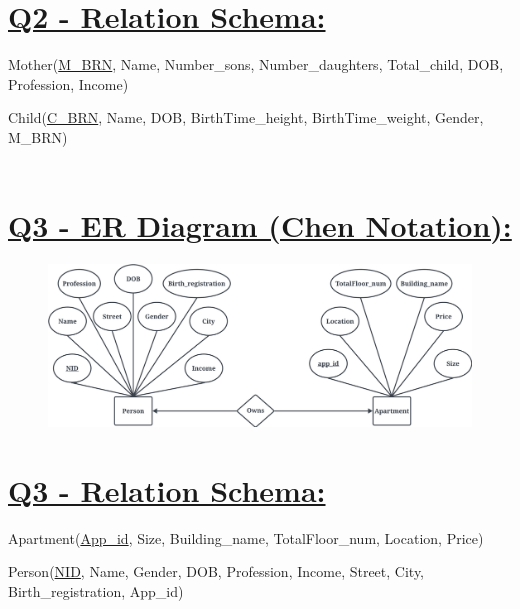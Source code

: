 \documentclass[a4paper, 12pt]{article}
\begin{document}
\section{\textbf{\uline{Q2 - Relation Schema:}}}
Mother(\uline{M\_BRN}, Name, Number\_sons, Number\_daughters, Total\_child, DOB, Profession, Income)

Child(\uline{C\_BRN}, Name, DOB, BirthTime\_height, BirthTime\_weight, Gender, M\_BRN) 
\\
\\
\section{\textbf{\uline{Q3 - ER Diagram (Chen Notation):}}}
\begin{figure}
    \centering
    \includegraphics[width=1\linewidth]{Q3.jpeg}
\end{figure}

\section{\textbf{\uline{Q3 - Relation Schema:}}}
Apartment(\uline{App\_id}, Size, Building\_name, TotalFloor\_num, Location, Price)

Person(\uline{NID}, Name, Gender, DOB, Profession, Income, Street, City, Birth\_registration, App\_id)
\end{document}

